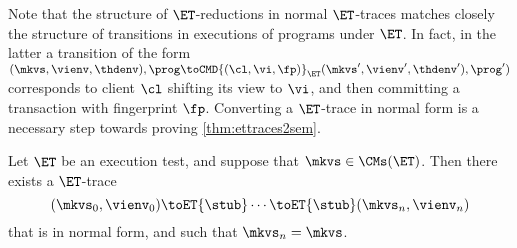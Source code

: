 Note that the structure of $\ET$-reductions in normal $\ET$-traces matches closely the structure of 
transitions in executions of  programs under $\ET$. 
In fact, in the latter a transition of the form $(\mkvs, \vienv, \thdenv ), \prog \toCMD{(\cl, \vi, \fp)}_{\ET} ( \mkvs', \vienv', \thdenv' ) , \prog' )$ 
corresponds to client $\cl$ shifting its view to $\vi$, and then committing a transaction with 
fingerprint $\fp$. 
Converting a $\ET$-trace in normal form is a necessary step towards proving \cref{thm:ettraces2sem}. 
\begin{proposition}
\label{prop:et.normalform}
Let $\ET$ be an execution test, and suppose that $\mkvs \in \CMs(\ET)$. Then there exists a $\ET$-trace  
\[
(\mkvs_0, \vienv_0) \toET{\stub} \cdots \toET{\stub} (\mkvs_n, \vienv_{n})
\]
that is in normal form, and such that $\mkvs_{n} = \mkvs$.
\end{proposition}
%
%
%
%
